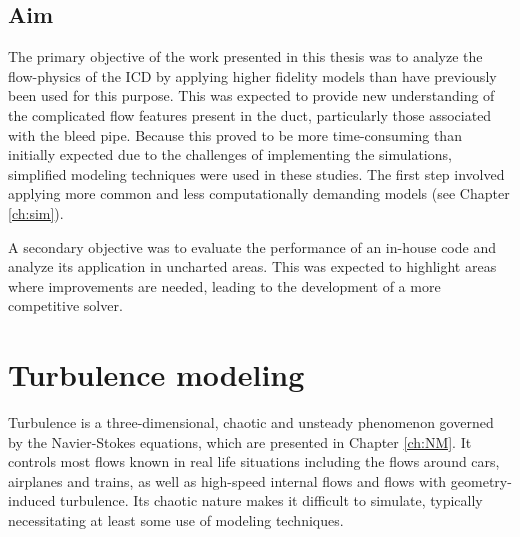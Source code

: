 \section{Aim}
The primary objective of the work presented in this thesis was to analyze the flow-physics of the ICD by applying higher fidelity models than have previously been used for this purpose. This was expected to provide new understanding of the complicated flow features present in the duct, particularly those associated with the bleed pipe. Because this proved to be more time-consuming than initially expected due to the challenges of implementing the simulations, simplified modeling techniques were used in these studies. The first step involved applying more common and less computationally demanding models (see Chapter \ref{ch:sim}).

A secondary objective was to evaluate the performance of an in-house code and analyze its application in uncharted areas. This was expected to highlight areas where improvements are needed, leading to the development of a more competitive solver.

\chapter{Turbulence modeling}
Turbulence is a three-dimensional, chaotic and unsteady phenomenon governed by the Navier-Stokes equations, which are presented in Chapter \ref{ch:NM}. It controls most flows known in real life situations including the flows around cars, airplanes and trains, as well as high-speed internal flows and flows with geometry-induced turbulence. Its chaotic nature makes it difficult to simulate, typically necessitating at least some use of modeling techniques. 

